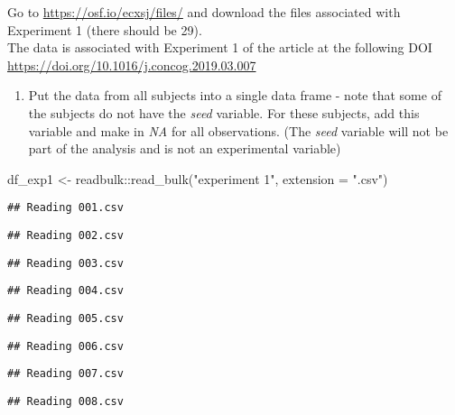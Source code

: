\documentclass[
]{article}
\newenvironment{Shaded}{\begin{snugshade}}{\end{snugshade}}
\newcommand{\AttributeTok}[1]{\textcolor[rgb]{0.77,0.63,0.00}{#1}}
\newcommand{\FunctionTok}[1]{\textcolor[rgb]{0.00,0.00,0.00}{#1}}
\newcommand{\NormalTok}[1]{#1}
\newcommand{\OtherTok}[1]{\textcolor[rgb]{0.56,0.35,0.01}{#1}}
\newcommand{\SpecialCharTok}[1]{\textcolor[rgb]{0.00,0.00,0.00}{#1}}
\newcommand{\StringTok}[1]{\textcolor[rgb]{0.31,0.60,0.02}{#1}}
\providecommand{\tightlist}{%
  \setlength{\itemsep}{0pt}\setlength{\parskip}{0pt}}
\begin{document}
Go to \url{https://osf.io/ecxsj/files/} and download the files
associated with Experiment 1 (there should be 29).\\
The data is associated with Experiment 1 of the article at the following
DOI \url{https://doi.org/10.1016/j.concog.2019.03.007}

\begin{enumerate}
\def\labelenumi{\arabic{enumi})}
\tightlist
\item
  Put the data from all subjects into a single data frame - note that
  some of the subjects do not have the \emph{seed} variable. For these
  subjects, add this variable and make in \emph{NA} for all
  observations. (The \emph{seed} variable will not be part of the
  analysis and is not an experimental variable)
\end{enumerate}

\begin{Shaded}
\begin{Highlighting}[]
\NormalTok{df\_exp1 }\OtherTok{\textless{}{-}}\NormalTok{ readbulk}\SpecialCharTok{::}\FunctionTok{read\_bulk}\NormalTok{(}\StringTok{"experiment 1"}\NormalTok{, }\AttributeTok{extension =} \StringTok{".csv"}\NormalTok{) }
\end{Highlighting}
\end{Shaded}

\begin{verbatim}
## Reading 001.csv
\end{verbatim}

\begin{verbatim}
## Reading 002.csv
\end{verbatim}

\begin{verbatim}
## Reading 003.csv
\end{verbatim}

\begin{verbatim}
## Reading 004.csv
\end{verbatim}

\begin{verbatim}
## Reading 005.csv
\end{verbatim}

\begin{verbatim}
## Reading 006.csv
\end{verbatim}

\begin{verbatim}
## Reading 007.csv
\end{verbatim}

\begin{verbatim}
## Reading 008.csv
\end{verbatim}
\end{document}
